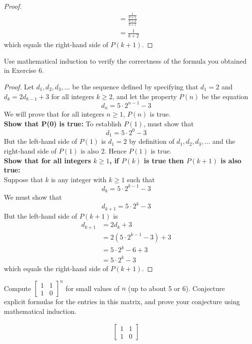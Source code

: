 \documentclass[12pt,letterpaper, onecolumn]{exam}
\begin{document}
\begin{questions}
\begin{solution}
\begin{proof}
\begin{align*}
			&=\frac{\frac{1}{k+1}}{\frac{k+2}{k+1}}\\
			&=\frac{1}{k+2}
		\end{align*}
		which equals the right-hand side of $P(k+1)$.
		\end{proof}
	\end{solution}
		\setcounter{question}{30} \question Use mathematical induction to verify the correctness of the formula you obtained in Exercise 6.
		\begin{solution}
			\begin{proof}
				Let $d_1,d_2,d_3,...$ be the sequence defined by specifying that $d_1=2$ and $d_k=2d_{k-1}+3$ for all integers $k\geq2$, and let the property $P(n)$ be the equation
				$$d_n=5\cdot2^{n-1}-3$$
				We will prove that for all integers $n\geq1$, $P(n)$ is true.\\
				\textbf{Show that P(0) is true:} To establish $P(1)$, must show that 
				$$d_1=5\cdot2^{0}-3$$
				But the left-hand side of $P(1)$ is $d_1=2$ by definition of  $d_1,d_2,d_3,...$ and the right-hand side of $P(1)$ is also 2. Hence $P(1)$ is true.\\
				\textbf{Show that for all integers $k\geq1$, if $P(k)$ is true then $P(k + 1)$ is also true:}\\
				Suppose that $k$ is any integer with $k\geq1$ such that
				$$d_k=5\cdot2^{k-1}-3$$
				We must show that
				$$d_{k+1}=5\cdot2^{k}-3$$
				But the left-hand side of $P(k+1)$ is
				\begin{align*}
					d_{k+1}&=2d_k+3\\
					&=2(5\cdot2^{k-1}-3)+3\\
					&=5\cdot2^k-6+3\\
					&=5\cdot2^k-3
				\end{align*}
				which equals the right-hand side of $P(k+1)$.
			\end{proof}
		\end{solution}
		\setcounter{question}{52}\question Compute $\begin{bmatrix}
			1 & 1\\ 
			1 & 0
		\end{bmatrix}^n$ for small values of $n$ (up to about 5 or 6). Conjecture explicit formulas for the entries in this matrix, and prove your conjecture using mathematical induction.
		\begin{solution}
			\begin{align*}
				\begin{bmatrix}
					1 & 1\\ 
					1 & 0

\end{bmatrix}
\end{align*}
\end{solution}
\end{questions}
\end{document}
